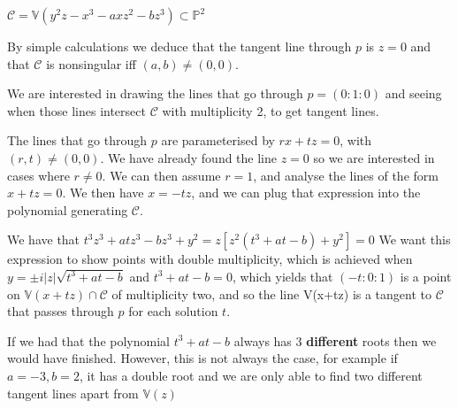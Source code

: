 \documentclass[10pt,a4paper]{report}
\author{Bittor Alaña}
\begin{document}
$\mathcal{C}=\mathds{V}(y^2z-x^3-axz^2-bz^3)\subset\mathds{P}^2$

By simple calculations we deduce that the tangent line through $p$ is $z=0$ and that $\mathcal{C}$ is nonsingular iff $(a,b)\neq(0,0)$. 

We are interested in drawing the lines that go through $p=(0:1:0)$ and seeing when those lines intersect $\mathcal{C}$ with multiplicity 2, to get tangent lines. 

The lines that go through $p$ are parameterised by $rx+tz=0$, with $(r,t)\neq(0,0)$. We have already found the line $z=0$ so we are interested in cases where $r\neq0$. We can then assume $r=1$, and analyse the lines of the form $x+tz=0$. We then have $x=-tz$, and we can plug that expression into the polynomial generating $\mathcal{C}$.

We have that $t^3z^3+atz^3-bz^3+y^2=z[z^2(t^3+at-b)+y^2]=0$
We want this expression to show points with double multiplicity, which is achieved when $y=\pm i|z|\sqrt{t^3+at-b}$ and $t^3+at-b=0$, which yields that $(-t:0:1)$ is a point on $\mathds{V}(x+tz)\cap\mathcal{C}$ of multiplicity two, and so the line {V}(x+tz) is a tangent to $\mathcal{C}$ that passes through $p$ for each solution $t$.

If we had that the polynomial $t^3+at-b$ always has 3 \textbf{different} roots then we would have finished. However, this is not always the case, for example if $a=-3,b=2$, it has a double root and we are only able to find two different tangent lines apart from $\mathds{V}(z)$
\end{document}
